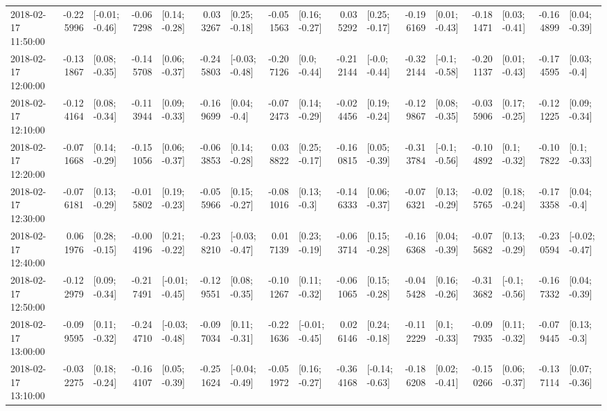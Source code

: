 \begin{tabular}{lrlrlrlrlrlrlrlrl}
2018-02-17 11:50:00 & -0.225996 &  [-0.01; -0.46] & -0.067298 &   [0.14; -0.28] &  0.033267 &   [0.25; -0.18] & -0.051563 &   [0.16; -0.27] &  0.035292 &   [0.25; -0.17] & -0.196169 &   [0.01; -0.43] & -0.181471 &   [0.03; -0.41] & -0.164899 &   [0.04; -0.39] \\
2018-02-17 12:00:00 & -0.131867 &   [0.08; -0.35] & -0.145708 &   [0.06; -0.37] & -0.245803 &  [-0.03; -0.48] & -0.207126 &    [0.0; -0.44] & -0.212144 &   [-0.0; -0.44] & -0.322144 &   [-0.1; -0.58] & -0.201137 &   [0.01; -0.43] & -0.174595 &    [0.03; -0.4] \\
2018-02-17 12:10:00 & -0.124164 &   [0.08; -0.34] & -0.113944 &   [0.09; -0.33] & -0.169699 &    [0.04; -0.4] & -0.072473 &   [0.14; -0.29] & -0.024456 &   [0.19; -0.24] & -0.129867 &   [0.08; -0.35] & -0.035906 &   [0.17; -0.25] & -0.121225 &   [0.09; -0.34] \\
2018-02-17 12:20:00 & -0.071668 &   [0.14; -0.29] & -0.151056 &   [0.06; -0.37] & -0.063853 &   [0.14; -0.28] &  0.038822 &   [0.25; -0.17] & -0.160815 &   [0.05; -0.39] & -0.313784 &   [-0.1; -0.56] & -0.104892 &    [0.1; -0.32] & -0.107822 &    [0.1; -0.33] \\
2018-02-17 12:30:00 & -0.076181 &   [0.13; -0.29] & -0.015802 &   [0.19; -0.23] & -0.055966 &   [0.15; -0.27] & -0.081016 &    [0.13; -0.3] & -0.146333 &   [0.06; -0.37] & -0.076321 &   [0.13; -0.29] & -0.025765 &   [0.18; -0.24] & -0.173358 &    [0.04; -0.4] \\
2018-02-17 12:40:00 &  0.061976 &   [0.28; -0.15] & -0.004196 &   [0.21; -0.22] & -0.238210 &  [-0.03; -0.47] &  0.017139 &   [0.23; -0.19] & -0.063714 &   [0.15; -0.28] & -0.166368 &   [0.04; -0.39] & -0.075682 &   [0.13; -0.29] & -0.230594 &  [-0.02; -0.47] \\
2018-02-17 12:50:00 & -0.122979 &   [0.09; -0.34] & -0.217491 &  [-0.01; -0.45] & -0.129551 &   [0.08; -0.35] & -0.101267 &   [0.11; -0.32] & -0.061065 &   [0.15; -0.28] & -0.045428 &   [0.16; -0.26] & -0.313682 &   [-0.1; -0.56] & -0.167332 &   [0.04; -0.39] \\
2018-02-17 13:00:00 & -0.099595 &   [0.11; -0.32] & -0.244710 &  [-0.03; -0.48] & -0.097034 &   [0.11; -0.31] & -0.221636 &  [-0.01; -0.45] &  0.026146 &   [0.24; -0.18] & -0.112229 &    [0.1; -0.33] & -0.097935 &   [0.11; -0.32] & -0.079445 &    [0.13; -0.3] \\
2018-02-17 13:10:00 & -0.032275 &   [0.18; -0.24] & -0.164107 &   [0.05; -0.39] & -0.251624 &  [-0.04; -0.49] & -0.051972 &   [0.16; -0.27] & -0.364168 &  [-0.14; -0.63] & -0.186208 &   [0.02; -0.41] & -0.150266 &   [0.06; -0.37] & -0.137114 &   [0.07; -0.36] \\

\end{tabular}
